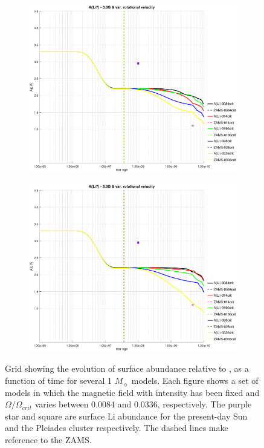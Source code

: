 \documentclass[fleqn,usenatbib]{mnras}
\begin{document}
\begin{figure}
    \begin{subfigure}[h]{0.47\textwidth}
    \includegraphics[trim = 40mm 15mm 20mm 15mm, clip,width=\textwidth]{figures/li_var_vel_5_0g.eps}
    \label{fig:subim5}
    \end{subfigure}
    \begin{subfigure}[h]{0.47\textwidth}
    \includegraphics[trim = 40mm 15mm 20mm 15mm, clip,width=\textwidth]{figures/li_var_vel_5_5g.eps}
    \label{fig:subim6}
    \end{subfigure}
\caption{Grid showing the evolution of surface  abundance relative to , as a function of time for several 1 $M_{\sun}$ models. Each figure shows a set of models in which the magnetic field with intensity has been fixed and $\Omega / \Omega_{crit}$ varies between 0.0084 and 0.0336, respectively. The purple star and square are surface Li abundance for the present-day Sun \citep{Asplund2009} and the Pleiades cluster \citep{Sestito2005} respectively. The dashed lines make reference to the ZAMS.}
\label{fig:image2}
\end{figure}
\par
\end{document}
